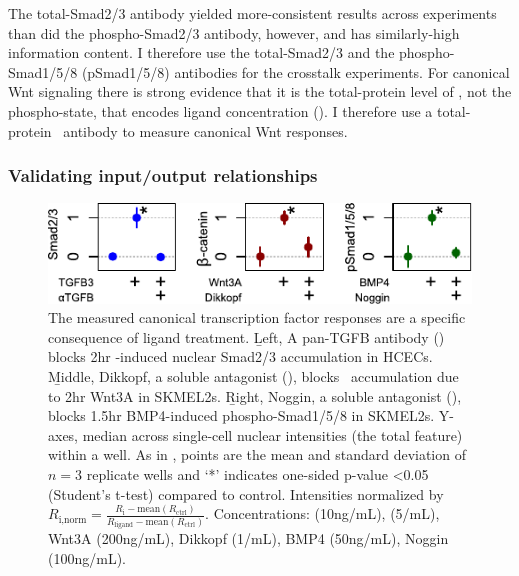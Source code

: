 The total-Smad2/3 antibody yielded more-consistent
results across experiments than did the phospho-Smad2/3 antibody,
however, and has similarly-high
information content. I therefore use the total-Smad2/3
and the phospho-Smad1/5/8 (pSmad1/5/8) antibodies for the crosstalk experiments.
For canonical Wnt signaling there is strong evidence that it is the
total-protein level of \bcat, not the phospho-state, that encodes ligand concentration
(). I therefore use a total-protein \bcat\ antibody
to measure canonical Wnt responses.


\subsubsection{Validating input/output relationships}



  \begin{figure}[!bt]
  \centering
  \includegraphics[width=4.5in]{FIGS/insulation/specificity+.pdf}
  {\singlespacing 
  \caption[Specificity of ligand/transcription factor relationships.]
        { The measured canonical transcription factor responses are a specific
          consequence of ligand treatment. \b{Left}, A
          pan-TGFB antibody ()
          blocks 2hr -induced
          nuclear Smad2/3 accumulation in HCECs. \b{Middle},
          Dikkopf, a soluble antagonist (),
          blocks \bcat\ accumulation due to 2hr Wnt3A in
          SKMEL2s. \b{Right},
          Noggin, a soluble antagonist (),
          blocks 1.5hr BMP4-induced phospho-Smad1/5/8 in SKMEL2s. Y-axes,
          median across single-cell nuclear intensities (the total feature)
          within a well. As in ,
          points are the mean and standard deviation
          of $n=3$ replicate wells and `*' indicates one-sided p-value <0.05
          (Student's t-test) compared to control. Intensities normalized by
          $R_\text{i,norm}=\frac{R_\text{i}-\text{mean}(R_\text{ctrl})}
          {R_\text{ligand}-\text{mean}(R_\text{ctrl})}$.
          Concentrations:  (10ng/mL),
           (5/mL),
          Wnt3A (200ng/mL), Dikkopf (1/mL),
          BMP4 (50ng/mL), Noggin (100ng/mL).}
  \label{fig:insulation:specificity}}
  \end{figure}
  
